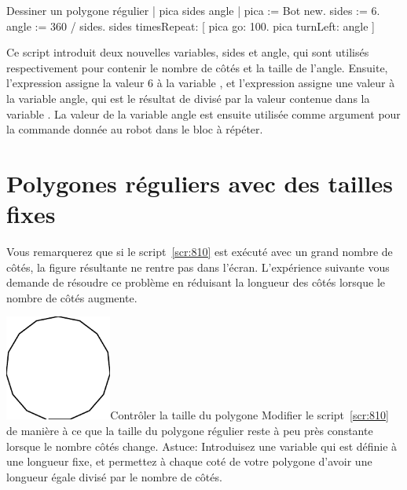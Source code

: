 \documentclass[a4paper,10pt,twoside]{book}
\begin{document}
\begin{script}[810]{Dessiner un polygone r\'egulier}
| pica sides angle | 
pica := Bot new. 
sides := 6. 
angle := 360 / sides. 
sides timesRepeat: 
	[ pica go: 100. 
	pica turnLeft: angle ]
\end{script}

Ce script introduit deux nouvelles variables,  sides et angle, qui sont utilis\'es respectivement pour contenir le nombre de c\^ot\'es et la taille de l'angle. Ensuite, l'expression   assigne la valeur 6 \`a la variable , et  l'expression   assigne une valeur \`a la variable angle, qui est le r\'esultat de  divis\'e par la valeur contenue dans la variable . La valeur de la variable  angle est ensuite utilis\'ee comme argument pour la commande  donn\'ee au robot dans le bloc \`a r\'ep\'eter.

\section{Polygones r\'eguliers avec des tailles fixes} 


Vous remarquerez que si le script~\ref{scr:810} est ex\'ecut\'e avec un grand nombre de c\^ot\'es, la figure r\'esultante ne rentre pas dans l'\'ecran. L'exp\'erience suivante vous demande de r\'esoudre ce probl\`eme en r\'eduisant la longueur des c\^ot\'es lorsque le nombre de c\^ot\'es augmente.


\begin{exofigwithsizeandtitle}[0.65]{\includegraphics[width=3.5cm]{varSameLength}}{Contr\^oler la taille du polygone}
Modifier le script~\ref{scr:810} de mani\`ere \`a ce que la taille du polygone r\'egulier reste \`a peu pr\`es constante lorsque le nombre c\^ot\'es change. Astuce: Introduisez une variable   qui est d\'efinie \`a une longueur fixe, et permettez \`a chaque cot\'e de votre polygone d'avoir une longueur \'egale  divis\'e par le nombre de c\^ot\'es. 


\end{exofigwithsizeandtitle}
\end{document}
